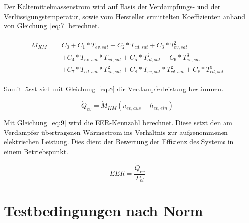 Der Kältemittelmassenstrom wird auf Basis der Verdampfungs- und der Verlüssigungstemperatur, sowie vom Hersteller ermittelten Koeffizienten anhand von Gleichung~\ref{eq:7} berechnet.

\begin{align}
\label{eq:7}
	\begin{split}
	\dot{M}_{KM} = &C_0 + C_1*T_{ev,sat} + C_2*T_{cd,sat} + C_3*T_{ev,sat}^2 \\
	&+C_4*T_{ev,sat}*T_{cd,sat} + C_5*T_{cd,sat}^2 + C_6*T_{ev,sat}^3 \\
	&+ C_7*T_{cd,sat}*T_{ev,sat}^2 +C_8*T_{ev,sat}*T_{cd,sat}^2 + C_9*T_{cd,sat}^3
	\end{split}
\end{align}

Somit lässt sich mit Gleichung~\ref{eq:8} die Verdampferleistung bestimmen.

\begin{equation}
\label{eq:8}
\dot{Q}_{ev}= \dot{M}_{KM}(h_{ev,aus} - h_{ev,ein})
\end{equation}

Mit Gleichung~\ref{eq:9} wird die EER-Kennzahl berechnet. Diese setzt den am Verdampfer übertragenen Wärmestrom ins Verhältnis zur aufgenommenen elektrischen Leistung. Dies dient der Bewertung der Effizienz des Systems in einem Betriebspunkt\cite{Muller.2016}.


\begin{equation}
\label{eq:9}
EER = \frac{\dot{Q}_{ev}}{P_{el}}
\end{equation}



\section{Testbedingungen nach Norm}
\label{sec:Testbedingungen nach Norm}

